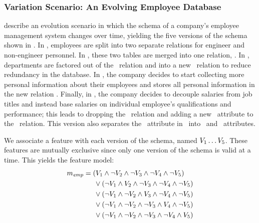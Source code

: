 \subsubsection{Variation Scenario: An Evolving Employee Database}
\label{app:emp-scenario}



\citet{prima08Moon} describe an evolution scenario in which the schema of a
company's employee management system changes over time, yielding the five
versions of the schema shown in .
%
In \vOne, employees are split into two separate relations for
engineer and non-engineer personnel.
%
In \vTwo, these two tables are merged into one relation, \empacct.
%
In \vThree, departments are factored out of the \empacct\ relation and
into a new \dept\ relation to reduce redundancy in the database.
%
In \vFour, the company decides to start collecting more personal
information about their employees and stores all personal information in the
new relation \empbio.
%
Finally, in \vFive, the company decides to decouple salaries from
job titles and instead base salaries on individual employee's qualifications
and performance; this leads to dropping the \job\ relation and adding a new
\salary\ attribute to the \empacct\ relation. This version also separates the
\name\ attribute in \empbio\ into \fname\ and \lname\ attributes.


We associate a feature with each version of the schema, named 
$\vOne\ldots\vFive$.
%
These features are mutually exclusive since only one version of the
schema is valid at a time. This yields the  feature model:
%
%
\begin{align*}
\fModel_\employee
  &=   \left(\vOne\wedge\neg\vTwo\wedge\neg\vThree\wedge\neg\vFour\wedge\neg\vFive\right)
  \\
  &\hspace{15pt} 
\vee\left(\neg\vOne\wedge\vTwo\wedge\neg\vThree\wedge\neg\vFour\wedge\neg\vFive\right)
  \\
  &   \hspace{15pt} 
  \vee\left(\neg\vOne\wedge\neg\vTwo\wedge\vThree\wedge\neg\vFour\wedge\neg\vFive\right)\\
   &
   \hspace{15pt} 
\vee\left(\neg\vOne\wedge\neg\vTwo\wedge\neg\vThree\wedge\vFour\wedge\neg\vFive\right)
  \\
  &   \hspace{15pt} 
  \vee\left(\neg\vOne\wedge\neg\vTwo\wedge\neg\vThree\wedge\neg\vFour\wedge\vFive\right)
\end{align*}

